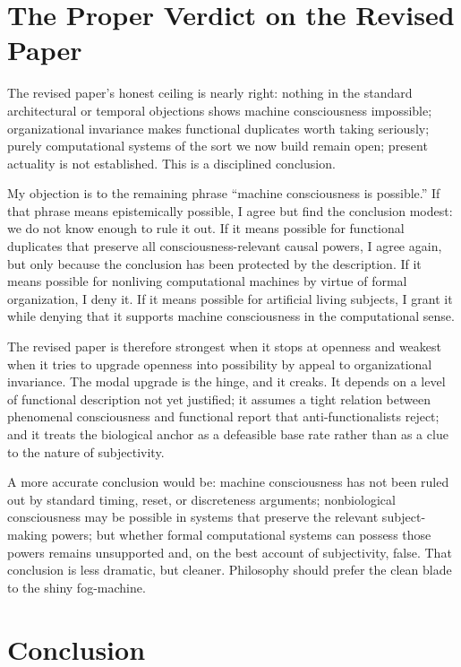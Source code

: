 \documentclass[11pt]{article}
\begin{document}
\section{The Proper Verdict on the Revised Paper}

The revised paper's honest ceiling is nearly right: nothing in the standard architectural or temporal objections shows machine consciousness impossible; organizational invariance makes functional duplicates worth taking seriously; purely computational systems of the sort we now build remain open; present actuality is not established. This is a disciplined conclusion.

My objection is to the remaining phrase ``machine consciousness is possible.'' If that phrase means epistemically possible, I agree but find the conclusion modest: we do not know enough to rule it out. If it means possible for functional duplicates that preserve all consciousness-relevant causal powers, I agree again, but only because the conclusion has been protected by the description. If it means possible for nonliving computational machines by virtue of formal organization, I deny it. If it means possible for artificial living subjects, I grant it while denying that it supports machine consciousness in the computational sense.

The revised paper is therefore strongest when it stops at openness and weakest when it tries to upgrade openness into possibility by appeal to organizational invariance. The modal upgrade is the hinge, and it creaks. It depends on a level of functional description not yet justified; it assumes a tight relation between phenomenal consciousness and functional report that anti-functionalists reject; and it treats the biological anchor as a defeasible base rate rather than as a clue to the nature of subjectivity.

A more accurate conclusion would be: machine consciousness has not been ruled out by standard timing, reset, or discreteness arguments; nonbiological consciousness may be possible in systems that preserve the relevant subject-making powers; but whether formal computational systems can possess those powers remains unsupported and, on the best account of subjectivity, false. That conclusion is less dramatic, but cleaner. Philosophy should prefer the clean blade to the shiny fog-machine.

\section{Conclusion}
\end{document}
